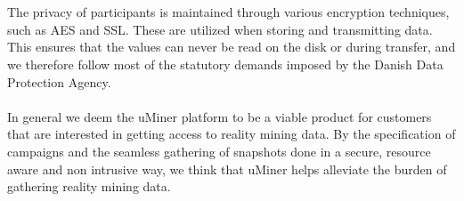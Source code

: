 \\\\
The privacy of participants is maintained through various encryption techniques, such as AES and SSL. These are utilized when storing and transmitting data. This ensures that the values can never be read on the disk or during transfer, and we therefore follow most of the statutory demands imposed by the Danish Data Protection Agency. 
\\\\
In general we deem the uMiner platform to be a viable product for customers that are interested in getting access to reality mining data. By the specification of campaigns and the seamless gathering of snapshots done in a secure, resource aware and non intrusive way, we think that uMiner helps alleviate the burden of gathering reality mining data.





